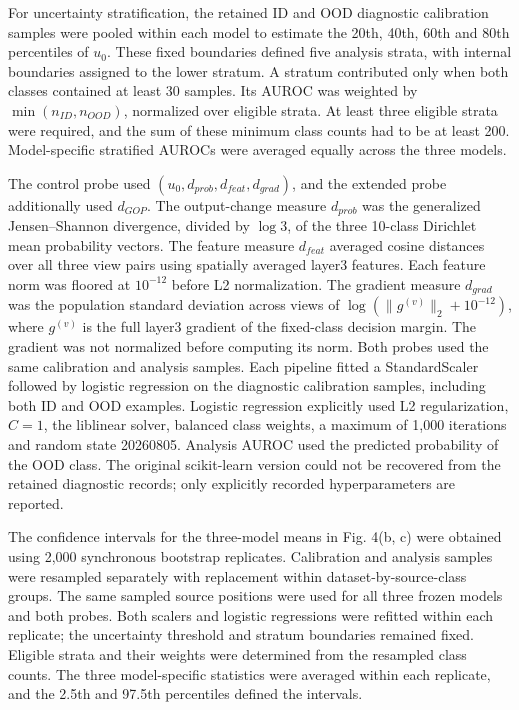 \documentclass[11pt,a4paper]{article}
\begin{document}
For uncertainty stratification, the retained ID and OOD diagnostic calibration samples were pooled within each model to estimate the 20th, 40th, 60th and 80th percentiles of \(u_{0}\). These fixed boundaries defined five analysis strata, with internal boundaries assigned to the lower stratum. A stratum contributed only when both classes contained at least 30 samples. Its AUROC was weighted by \(\min\left( n_{ID},n_{OOD} \right)\), normalized over eligible strata. At least three eligible strata were required, and the sum of these minimum class counts had to be at least 200. Model-specific stratified AUROCs were averaged equally across the three models.

The control probe used \(\left( u_{0},d_{prob},d_{feat},d_{grad} \right)\), and the extended probe additionally used \(d_{GOP}\). The output-change measure \(d_{prob}\) was the generalized Jensen--Shannon divergence, divided by \(\log 3\), of the three 10-class Dirichlet mean probability vectors. The feature measure \(d_{feat}\) averaged cosine distances over all three view pairs using spatially averaged layer3 features. Each feature norm was floored at \(10^{- 12}\) before L2 normalization. The gradient measure \(d_{grad}\) was the population standard deviation across views of \(\log\left( \parallel g^{(v)} \parallel_{2} + 10^{- 12} \right)\), where \(g^{(v)}\) is the full layer3 gradient of the fixed-class decision margin. The gradient was not normalized before computing its norm. Both probes used the same calibration and analysis samples. Each pipeline fitted a StandardScaler followed by logistic regression on the diagnostic calibration samples, including both ID and OOD examples. Logistic regression explicitly used L2 regularization, \(C = 1\), the liblinear solver, balanced class weights, a maximum of 1,000 iterations and random state 20260805. Analysis AUROC used the predicted probability of the OOD class. The original scikit-learn version could not be recovered from the retained diagnostic records; only explicitly recorded hyperparameters are reported.

The confidence intervals for the three-model means in Fig. 4(b, c) were obtained using 2,000 synchronous bootstrap replicates. Calibration and analysis samples were resampled separately with replacement within dataset-by-source-class groups. The same sampled source positions were used for all three frozen models and both probes. Both scalers and logistic regressions were refitted within each replicate; the uncertainty threshold and stratum boundaries remained fixed. Eligible strata and their weights were determined from the resampled class counts. The three model-specific statistics were averaged within each replicate, and the 2.5th and 97.5th percentiles defined the intervals.
\end{document}
